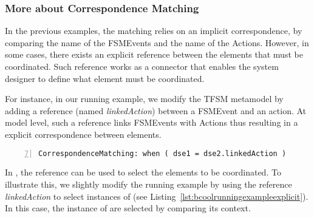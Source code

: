 \subsubsection{More about Correspondence Matching}
\label{subsubsec:explicitcorrespondence}


In the previous examples, the matching relies on an implicit correspondence, \ie by comparing the name of the FSMEvents and the name of the Actions. However, in some cases, there exists an explicit reference between the elements that must be coordinated. Such reference works as a connector that enables the system designer to define what element must be coordinated. 
	
For instance, in our running example, we modify the TFSM metamodel by adding a reference (named \emph{linkedAction}) between a FSMEvent and an action. At model level, such a reference links FSMEvents with Actions thus resulting in a explicit correspondence between elements.
	
\begin{lstlisting}[language=bcool,
	caption={A correspondence matching that relies on a explicit reference},
	label={lst:bcoolrunningexampleexplicit}, 
	basicstyle=\scriptsize\ttfamily, backgroundcolor=\color{LGrey}, numbers=left, firstnumber=7, xleftmargin=2pt]
	CorrespondenceMatching: when ( dse1 = dse2.linkedAction )
\end{lstlisting}
	
In \bcool, the reference can be used to select the elements to be coordinated. To illustrate this, we slightly modify the running example by using the reference \emph{linkedAction} to select instances of \dse (see Listing~\ref{lst:bcoolrunningexampleexplicit}). In this case, the instance of \dse are selected by comparing its context.  

	

